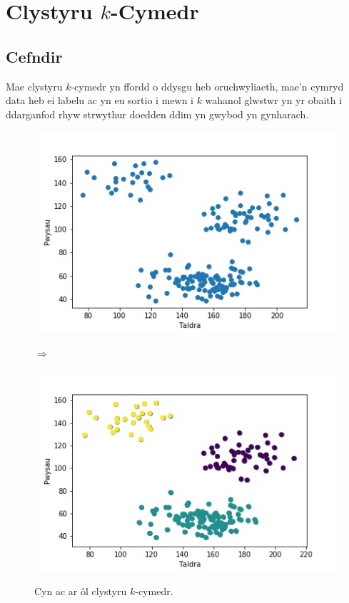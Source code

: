 \chapter{Clystyru $k$-Cymedr}\label{cha:literature}
\section{Cefndir}
Mae clystyru $k$-cymedr yn ffordd o ddysgu heb oruchwyliaeth, mae'n cymryd data heb ei labelu ac yn eu sortio i mewn i $k$ wahanol glwstwr yn yr obaith i ddarganfod rhyw strwythur doedden ddim yn gwybod yn gynharach.

\begin{figure}
\begin{center}
\begin{minipage}{.4\linewidth}
\includegraphics[width=1\linewidth]{../img/Scatterpython.jpeg}
\end{minipage}%
\begin{minipage}{1cm}
$\Rightarrow$
\end{minipage}%
\begin{minipage}{.4\linewidth}
\includegraphics[width=1\linewidth]{../img/3clystwrpython.jpeg}
\end{minipage}%
\label{fig:Cefndir_Clysteru_k_modd}
\caption{Cyn ac ar \^{o}l clystyru $k$-cymedr.}
\end{center}
\end{figure}

